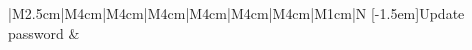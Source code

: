 \documentclass[12pt,a4paper]{article}
\begin{document}
\begin{table}[H]
\begin{tabular}{|M{2.5cm}|M{4cm}|M{4cm}|M{4cm}|M{4cm}|M{4cm}|M{4cm}|M{1cm}|N}
%
\hline%
[-1.5em]{\centering Update password
} &


\end{tabular}
\end{table}
\end{document}
